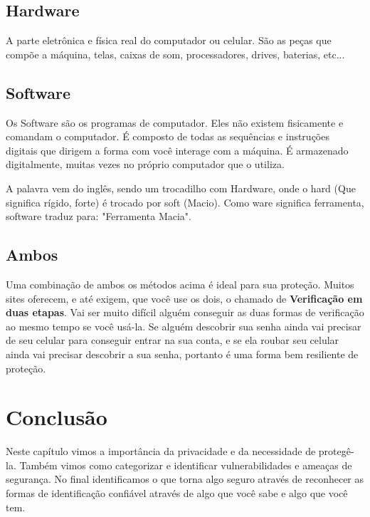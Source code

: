 \begin{saibamais}
\subsection*{Hardware}

A parte eletrônica e física real do computador ou celular. São as peças que compõe a máquina, telas, caixas de som, processadores, drives, baterias, etc... \\

\subsection*{Software}

Os Software são os programas de computador. Eles não existem fisicamente e comandam o computador. É composto de todas as sequências e instruções digitais que dirigem a forma com você interage com a máquina. É armazenado digitalmente, muitas vezes no próprio computador que o utiliza.

A palavra vem do inglês, sendo um trocadilho com Hardware, onde o hard (Que significa rígido, forte) é trocado por soft (Macio). Como ware significa ferramenta, software traduz para: "Ferramenta Macia".

\end{saibamais}

\subsection{Ambos}

Uma combinação de ambos os métodos acima é ideal para sua proteção. Muitos sites oferecem, e até exigem, que você use os dois, o chamado de \textbf{Verificação em duas etapas}. Vai ser muito difícil alguém conseguir as duas formas de verificação ao mesmo tempo se você usá-la. Se alguém descobrir sua senha ainda vai precisar de seu celular para conseguir entrar na sua conta, e se ela roubar seu celular ainda vai precisar descobrir a sua senha, portanto é uma forma bem resiliente de proteção.

\section{Conclusão}

Neste capítulo vimos a importância da privacidade e da necessidade de protegê-la. Também vimos como categorizar e identificar vulnerabilidades e ameaças de segurança. No final identificamos o que torna algo seguro através de reconhecer as formas de identificação confiável através de algo que você sabe e algo que você tem.

